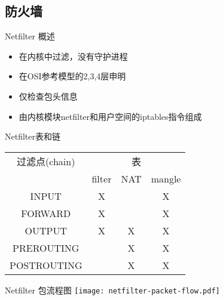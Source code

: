 %
%

\subsection{防火墙}

\begin{frame}{Netfilter 概述}
\begin{itemize}
\item 在内核中过滤，没有守护进程
\item 在OSI参考模型的2,3,4层申明
\item 仅检查包头信息
\item 由内核模块netfilter和用户空间的iptables指令组成
\end{itemize}

\end{frame} 
 \begin{frame}{Netfilter表和链}

\begin{center}
\begin{tabular}{|c|c|c|c|}
\hline 
过滤点(chain) & \multicolumn{3}{c|}{表}\tabularnewline
\cline{2-4} 
 & filter & NAT & mangle\tabularnewline
\hline 
INPUT & X &  & X\tabularnewline
\hline 
FORWARD & X &  & X\tabularnewline
\hline 
OUTPUT & X & X & X\tabularnewline
\hline 
PREROUTING &  & X & X\tabularnewline
\hline 
POSTROUTING &  & X & X\tabularnewline
\hline 
\end{tabular}
\par\end{center}


\end{frame} 
 \begin{frame}{Netfilter 包流程图}
\center
\texttt{[image: netfilter-packet-flow.pdf]}
\end{frame} 

